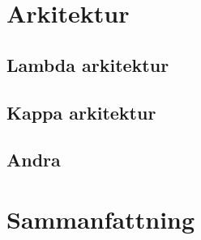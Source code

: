 \chapter{Arkitektur}

\section{Lambda arkitektur}

\section{Kappa arkitektur}

\section{Andra}

\chapter{Sammanfattning}
